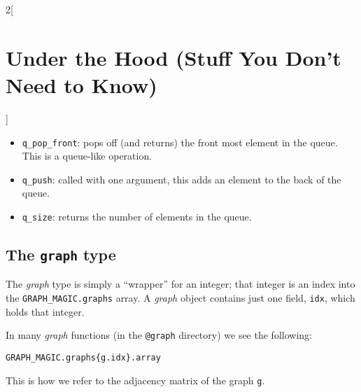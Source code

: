 \documentclass{amsart}
\begin{document}
\begin{multicols}{2}[\section{Under the Hood (Stuff You Don't Need to Know)}]
\begin{itemize}
\item \verb|q_pop_front|: pops off (and returns) the front most element in the
  queue. This is a queue-like operation.

\item \verb|q_push|: called with one argument, this adds an element to
  the back of the queue.

\item \verb|q_size|: returns the number of elements in the queue. 
\end{itemize}


\subsection{The \texttt{graph} type}

The \emph{graph} type is simply a ``wrapper'' for an integer; that
integer is an index into the \verb|GRAPH_MAGIC.graphs| array.  A
\emph{graph} object contains just one field, \verb|idx|, which holds
that integer.

In many \emph{graph} functions (in the \verb|@graph| directory) we see
the following:
\begin{verbatim}
GRAPH_MAGIC.graphs{g.idx}.array
\end{verbatim}
This is how we refer to the adjacency matrix of the graph \verb|g|.

\end{multicols}



  

\end{document}

